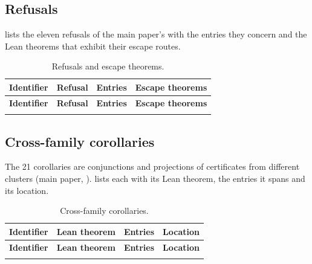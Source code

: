 \subsection{Refusals}

 lists the eleven refusals of the main paper's  with the
entries they concern and the Lean theorems that exhibit their escape routes.

{\scriptsize
\begin{longtable}{@{}l>{\raggedright\arraybackslash}p{4.4cm}>{\raggedright\arraybackslash}p{2.6cm}>{\raggedright\arraybackslash}p{5.8cm}@{}}
\caption{Refusals and escape theorems.}\label{tab:nogo}\\
\toprule
\textbf{Identifier} & \textbf{Refusal} & \textbf{Entries} & \textbf{Escape theorems} \\
\midrule
\endfirsthead
\toprule
\textbf{Identifier} & \textbf{Refusal} & \textbf{Entries} & \textbf{Escape theorems} \\
\midrule
\endhead
\bottomrule
\endfoot

\end{longtable}
}

\subsection{Cross-family corollaries}

The 21 corollaries are conjunctions and projections of certificates from different
clusters (main paper, ).  lists each with
its Lean theorem, the entries it spans and its location.

{\scriptsize
\begin{longtable}{@{}l>{\raggedright\arraybackslash}p{6.6cm}>{\raggedright\arraybackslash}p{2.8cm}>{\raggedright\arraybackslash}p{3.8cm}@{}}
\caption{Cross-family corollaries.}\label{tab:corollaries}\\
\toprule
\textbf{Identifier} & \textbf{Lean theorem} & \textbf{Entries} & \textbf{Location} \\
\midrule
\endfirsthead
\toprule
\textbf{Identifier} & \textbf{Lean theorem} & \textbf{Entries} & \textbf{Location} \\
\midrule
\endhead
\bottomrule
\endfoot

\end{longtable}
}
